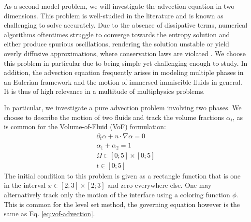 \documentclass[asi,article,submit,moreauthors]{Definitions/mdpi}
\begin{document}
As a second model problem, we will investigate the advection equation in two dimensions.
This problem is well-studied in the literature and is known as challenging to solve accurately.
Due to the absence of dissipative terms, numerical algorithms oftentimes struggle to converge towards the entropy solution and either produce spurious oscillations, rendering the solution unstable or yield overly diffusive approximations, where conservation laws are violated \cite{levequeNumericalMethodsConservation1992}.
We choose this problem in particular due to being simple yet challenging enough to study.
In addition, the advection equation frequently arises in modeling multiple phases in an Eulerian framework and the motion of immersed immiscible fluids in general.
It is thus of high relevance in a multitude of multiphysics problems.

In particular, we investigate a pure advection problem involving two phases. 
We choose to describe the motion of two fluids and track the volume fractions $\alpha_i$, as is common for the Volume-of-Fluid (VoF) formulation:
\begin{align}
    \partial_t \alpha + \underline{u} \cdot \nabla \alpha = 0  \label{eq:vof-advection}\\
    \alpha_1 + \alpha_2 = 1 \label{eq:vof-sum} \\
    \Omega \in \left[0;5\right] \times \left[0;5\right] \\
    t \in \left[0;5\right]
\end{align}
The initial condition to this problem is given as a rectangle function that is one in the interval $x \in \left[2;3\right] \times \left[2;3\right]$ and zero everywhere else.
One may alternatively track only the motion of the interface using a coloring function $\phi$. 
This is common for the level set method, the governing equation however is the same as Eq. \ref{eq:vof-advection}.
\end{document}
